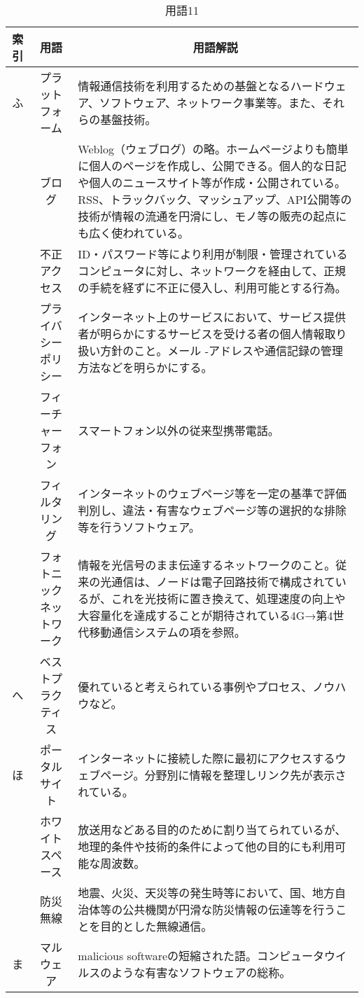 \begin{table}[htb]
  \begin{center}
    \caption{用語11}
    \begin{tabular}{|c|c|p{10cm}|}
      \hline
      索引 & 用語 & \multicolumn{1}{c|}{用語解説} \\
      \hline
      ふ & プラットフォーム & 情報通信技術を利用するための基盤となるハードウェア、ソフトウェア、ネットワーク事業等。また、それらの基盤技術。\\
      \cline{2-3}
      & ブログ & Weblog（ウェブログ）の略。ホームページよりも簡単に個人のページを作成し、公開できる。個人的な日記や個人のニュースサイト等が作成・公開されている。 RSS、トラックバック、マッシュアップ、API公開等の技術が情報の流通を円滑にし、モノ等の販売の起点にも広く使われている。\\
      \cline{2-3}
      & 不正アクセス & ID・パスワード等により利用が制限・管理されているコンピュータに対し、ネットワークを経由して、正規の手続を経ずに不正に侵入し、利用可能とする行為。\\
      \cline{2-3}
      & プライバシーポリシー & インターネット上のサービスにおいて、サービス提供者が明らかにするサービスを受ける者の個人情報取り扱い方針のこと。メール -アドレスや通信記録の管理方法などを明らかにする。\\
      \cline{2-3}
      & フィーチャーフォン & スマートフォン以外の従来型携帯電話。\\
      \cline{2-3}
      & フィルタリング & インターネットのウェブページ等を一定の基準で評価判別し、違法・有害なウェブページ等の選択的な排除等を行うソフトウェア。\\
      \cline{2-3}
      & フォトニックネットワーク & 情報を光信号のまま伝達するネットワークのこと。従来の光通信は、ノードは電子回路技術で構成されているが、これを光技術に置き換えて、処理速度の向上や大容量化を達成することが期待されている4G→第4世代移動通信システムの項を参照。\\
      \hline
      へ & ベストプラクティス & 優れていると考えられている事例やプロセス、ノウハウなど。\\
      \hline
      ほ & ポータルサイト & インターネットに接続した際に最初にアクセスするウェブページ。分野別に情報を整理しリンク先が表示されている。\\
      \cline{2-3}
      & ホワイトスペース & 放送用などある目的のために割り当てられているが、地理的条件や技術的条件によって他の目的にも利用可能な周波数。\\
      \cline{2-3}
      & 防災無線 & 地震、火災、天災等の発生時等において、国、地方自治体等の公共機関が円滑な防災情報の伝達等を行うことを目的とした無線通信。\\
      \hline
      ま & マルウェア & malicious softwareの短縮された語。コンピュータウイルスのような有害なソフトウェアの総称。\\
      \hline
    \end{tabular}
  \end{center}
\end{table}



